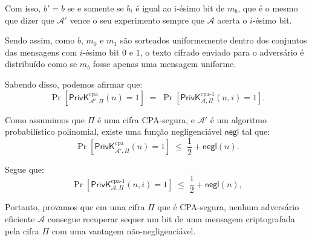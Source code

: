 \documentclass[11pt,a4paper]{article}
\newcommand{\negl}{\mathsf{negl}}
\newcommand{\PrivKcpa}[3]{\mathsf{PrivK}^{\mathrm{cpa}}_{#1,#2}(#3)}
\newcommand{\PrivKbit}[3]{\mathsf{PrivK}^{\mathrm{cpa}\text{-}1}_{#1,#2}(#3)}
\begin{document}
    Com isso, $b' = b$ se e somente se $b_i$ é igual ao i-ésimo bit de $m_b$, que é o mesmo que dizer que
    $\mathcal{A}'$ vence o seu experimento sempre que $\mathcal{A}$ acerta o $i$-ésimo bit.

    Sendo assim, como $b$, $m_0$ e $m_1$ são sorteados uniformemente dentro
    dos conjuntos das mensagens com $i$-ésimo bit $0$ e $1$, o texto cifrado enviado
    para o adversário é distribuído como se $m_b$ fosse apenas uma mensagem uniforme.

    Sabendo disso, podemos afirmar que:
    \[
        \Pr\!\left[\PrivKcpa{\mathcal{A}'}{\Pi}{n} = 1\right]
        \;=\;
        \Pr\!\left[\PrivKbit{\mathcal{A}}{\Pi}{n,i} = 1\right].
    \]

    Como assumimos que $\Pi$ é uma cifra CPA-segura, e $\mathcal{A}'$ é um algoritmo
    probabilístico polinomial, existe uma função negligenciável $\negl$ tal que:
    \[
        \Pr\!\left[\PrivKcpa{\mathcal{A}'}{\Pi}{n} = 1\right]
        \;\le\; \frac{1}{2} + \negl(n).
    \]

    Segue que:
    \[
        \Pr\!\left[\PrivKbit{\mathcal{A}}{\Pi}{n,i} = 1\right]
        \;\le\; \frac{1}{2} + \negl(n),
    \]

    Portanto, provamos que em uma cifra $\Pi$ que é CPA-segura, nenhum adversário
    eficiente $\mathcal{A}$ consegue recuperar sequer um bit de uma mensagem criptografada
    pela cifra $\Pi$ com uma vantagem não-negligenciável.
\end{document}
